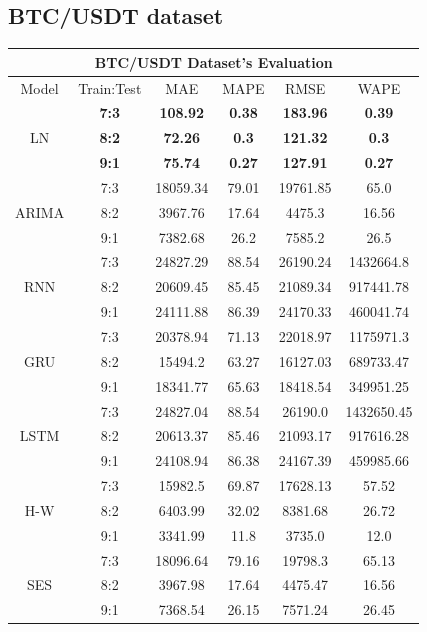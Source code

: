 \documentclass{ieeeojies}
\begin{document}
\subsection{BTC/USDT dataset}
\begin{table}[H]
    \centering
    \begin{tabular}{|c|c|c|c|c|c|}
         \hline
         \multicolumn{6}{|c|}{\textbf{BTC/USDT Dataset's Evaluation}}\\
         \hline
         \centering Model & Train:Test & MAE & MAPE & RMSE & WAPE \\ 
         \hline
         \multirow{3}{*}{LN} & \textbf{7:3} & \textbf{108.92} & \textbf{0.38} & \textbf{183.96} & \textbf{0.39} \\ & \textbf{8:2} & \textbf{72.26} & \textbf{0.3} & \textbf{121.32} & \textbf{0.3} \\ & \textbf{9:1} & \textbf{75.74} & \textbf{0.27} & \textbf{127.91} & \textbf{0.27} \\ 
         \hline
         \multirow{3}{*}{ARIMA} & 7:3 & 18059.34 & 79.01 & 19761.85 & 65.0 \\ & 8:2 & 3967.76 & 17.64 & 4475.3 & 16.56 \\ & 9:1 & 7382.68 & 26.2 & 7585.2 & 26.5 \\
         \hline
         \multirow{3}{*}{RNN} & 7:3 & 24827.29 & 88.54 & 26190.24 & 1432664.8 \\ & 8:2 & 20609.45 & 85.45 & 21089.34 & 917441.78 \\ & 9:1 & 24111.88 & 86.39 & 24170.33 & 460041.74 \\
         \hline
         \multirow{3}{*}{GRU} & 7:3 & 20378.94 & 71.13 & 22018.97 & 1175971.3 \\ & 8:2 & 15494.2 & 63.27 & 16127.03 & 689733.47 \\ & 9:1 & 18341.77 & 65.63 & 18418.54 & 349951.25 \\
         \hline
         \multirow{3}{*}{LSTM} & 7:3 & 24827.04 & 88.54 & 26190.0 & 1432650.45 \\ & 8:2 & 20613.37 & 85.46 & 21093.17 & 917616.28 \\ & 9:1 & 24108.94 & 86.38 & 24167.39 & 459985.66 \\
         \hline
         \multirow{3}{*}{H-W} & 7:3 & 15982.5 & 69.87 & 17628.13 & 57.52 \\ & 8:2 & 6403.99 & 32.02 & 8381.68 & 26.72 \\ & 9:1 & 3341.99 & 11.8 & 3735.0 & 12.0 \\
         \hline
         \multirow{3}{*}{SES} & 7:3 & 18096.64 & 79.16 & 19798.3 & 65.13 \\ & 8:2 & 3967.98 & 17.64 & 4475.47 & 16.56 \\ & 9:1 & 7368.54 & 26.15 & 7571.24 & 26.45 \\

\end{tabular}
\end{table}
\end{document}
